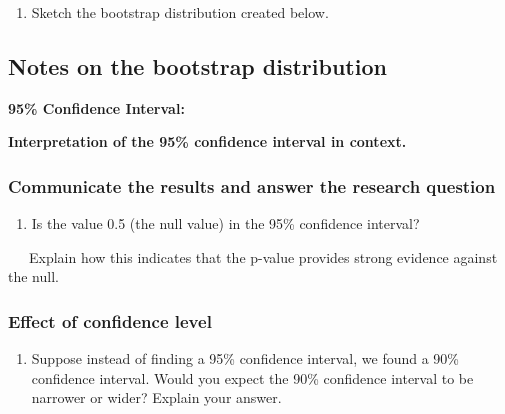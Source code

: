 \documentclass[
]{report}
\providecommand{\tightlist}{%
  \setlength{\itemsep}{0pt}\setlength{\parskip}{0pt}}
\begin{document}
\begin{enumerate}
\def\labelenumi{\arabic{enumi}.}
\setcounter{enumi}{6}
\tightlist
\item
  Sketch the bootstrap distribution created below.
\end{enumerate}

\vspace{1.8in}

\subsection*{Notes on the bootstrap distribution}\label{notes-on-the-bootstrap-distribution}

\vspace{1.5in}

\textbf{95\% Confidence Interval:}

\textbf{Interpretation of the 95\% confidence interval in context.}

\vspace{.6in}

\subsubsection*{Communicate the results and answer the research question}\label{communicate-the-results-and-answer-the-research-question-1}

\begin{enumerate}
\def\labelenumi{\arabic{enumi}.}
\setcounter{enumi}{7}
\tightlist
\item
  Is the value 0.5 (the null value) in the 95\% confidence interval?
\end{enumerate}

\vspace{.2in}

~~~Explain how this indicates that the p-value provides strong evidence against the null.

\vspace{0.5in}

\subsubsection*{Effect of confidence level}\label{effect-of-confidence-level}

\begin{enumerate}
\def\labelenumi{\arabic{enumi}.}
\setcounter{enumi}{8}
\tightlist
\item
  Suppose instead of finding a 95\% confidence interval, we found a 90\% confidence interval. Would you expect the 90\% confidence interval to be narrower or wider? Explain your answer.
\end{enumerate}
\end{document}
